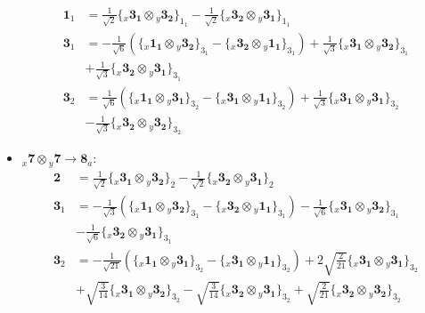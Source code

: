 \documentclass[english]{article}
\newcommand{\rep}[1]{\mathbf{#1}}
\newcommand{\repx}[2]{{}_{#2}\mathbf{#1}}
\newcommand{\tsprodx}[2]{\repx{#1}{x}\otimes\repx{#2}{y}}
\newcommand{\subcgs}[3]{\big\{ \tsprodx{#1}{#2}\big\}^{}_{#3}}
\begin{document}
\begin{itemize}
\begin{align*}
\rep{1}_{1} & = \frac{1}{\sqrt{2}}\subcgs{3_{1}}{3_{2}}{1_{1}}-\frac{1}{\sqrt{2}}\subcgs{3_{2}}{3_{1}}{1_{1}}
\\
\rep{3}_{1} & = -\frac{1}{\sqrt{6}}\left(\subcgs{1_{1}}{3_{2}}{3_{1}}-\subcgs{3_{2}}{1_{1}}{3_{1}}\right)+\frac{1}{\sqrt{3}}\subcgs{3_{1}}{3_{2}}{3_{1}} \\ 
 & +\frac{1}{\sqrt{3}}\subcgs{3_{2}}{3_{1}}{3_{1}}
\\
\rep{3}_{2} & = \frac{1}{\sqrt{6}}\left(\subcgs{1_{1}}{3_{1}}{3_{2}}-\subcgs{3_{1}}{1_{1}}{3_{2}}\right)+\frac{1}{\sqrt{3}}\subcgs{3_{1}}{3_{1}}{3_{2}} \\ 
 & -\frac{1}{\sqrt{3}}\subcgs{3_{2}}{3_{2}}{3_{2}}
\end{align*}
\item $\tsprodx{7}{7}\to\rep{8}_{a}$:
\begin{align*}
\rep{2} & = \frac{1}{\sqrt{2}}\subcgs{3_{1}}{3_{2}}{2}-\frac{1}{\sqrt{2}}\subcgs{3_{2}}{3_{1}}{2}
\\
\rep{3}_{1} & = -\frac{1}{\sqrt{3}}\left(\subcgs{1_{1}}{3_{2}}{3_{1}}-\subcgs{3_{2}}{1_{1}}{3_{1}}\right)-\frac{1}{\sqrt{6}}\subcgs{3_{1}}{3_{2}}{3_{1}} \\ 
 & -\frac{1}{\sqrt{6}}\subcgs{3_{2}}{3_{1}}{3_{1}}
\\
\rep{3}_{2} & = -\frac{1}{\sqrt{21}}\left(\subcgs{1_{1}}{3_{1}}{3_{2}}-\subcgs{3_{1}}{1_{1}}{3_{2}}\right)+2 \sqrt{\frac{2}{21}}\subcgs{3_{1}}{3_{1}}{3_{2}} \\ 
 & +\sqrt{\frac{3}{14}}\subcgs{3_{1}}{3_{2}}{3_{2}}-\sqrt{\frac{3}{14}}\subcgs{3_{2}}{3_{1}}{3_{2}}+\sqrt{\frac{2}{21}}\subcgs{3_{2}}{3_{2}}{3_{2}}
\end{align*}
\end{itemize}
\end{document}
